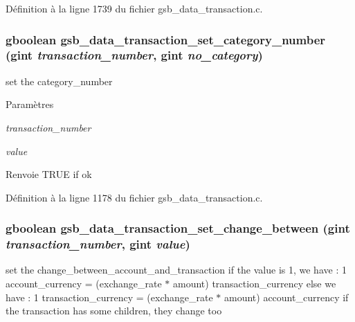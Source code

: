 Définition à la ligne 1739 du fichier gsb\_\-data\_\-transaction.c.

\subsubsection[{gsb\_\-data\_\-transaction\_\-set\_\-category\_\-number}]{\setlength{\rightskip}{0pt plus 5cm}gboolean gsb\_\-data\_\-transaction\_\-set\_\-category\_\-number (gint {\em transaction\_\-number}, \/  gint {\em no\_\-category})}\label{gsb__data__transaction_8c_a31f2706a543b988ba279b1cddb40c53e}
set the category\_\-number 
\begin{DoxyParams}{Paramètres}
\item[{\em transaction\_\-number}]\item[{\em value}]\end{DoxyParams}
\begin{DoxyReturn}{Renvoie}
TRUE if ok 
\end{DoxyReturn}


Définition à la ligne 1178 du fichier gsb\_\-data\_\-transaction.c.

\subsubsection[{gsb\_\-data\_\-transaction\_\-set\_\-change\_\-between}]{\setlength{\rightskip}{0pt plus 5cm}gboolean gsb\_\-data\_\-transaction\_\-set\_\-change\_\-between (gint {\em transaction\_\-number}, \/  gint {\em value})}\label{gsb__data__transaction_8c_a2f40c4afd62edb73a6da1b79951c3fa3}
set the change\_\-between\_\-account\_\-and\_\-transaction if the value is 1, we have : 1 account\_\-currency = (exchange\_\-rate $\ast$ amount) transaction\_\-currency else we have : 1 transaction\_\-currency = (exchange\_\-rate $\ast$ amount) account\_\-currency if the transaction has some children, they change too


